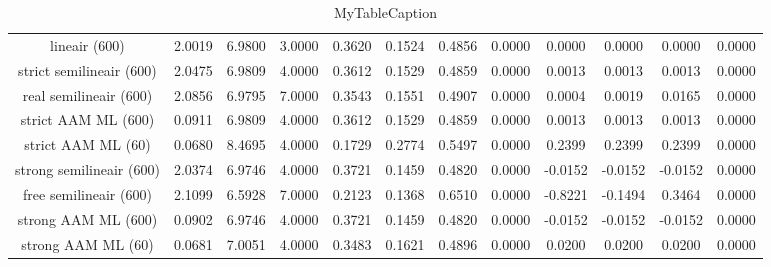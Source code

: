 \begin{table}
\centering
\begin{tabular}{|c|c|c|c|c|c|c|c|c|c|c|c|}
\hline
 &  &  &  &  &  &  &  &  &  &  &  \\
\hline
lineair (600) & 2.0019 & 6.9800 & 3.0000 & 0.3620 & 0.1524 & 0.4856 & 0.0000 & 0.0000 & 0.0000 & 0.0000 & 0.0000 \\
\hline
strict semilineair (600) & 2.0475 & 6.9809 & 4.0000 & 0.3612 & 0.1529 & 0.4859 & 0.0000 & 0.0013 & 0.0013 & 0.0013 & 0.0000 \\
\hline
real semilineair (600) & 2.0856 & 6.9795 & 7.0000 & 0.3543 & 0.1551 & 0.4907 & 0.0000 & 0.0004 & 0.0019 & 0.0165 & 0.0000 \\
\hline
strict AAM ML (600) & 0.0911 & 6.9809 & 4.0000 & 0.3612 & 0.1529 & 0.4859 & 0.0000 & 0.0013 & 0.0013 & 0.0013 & 0.0000 \\
\hline
strict AAM ML (60) & 0.0680 & 8.4695 & 4.0000 & 0.1729 & 0.2774 & 0.5497 & 0.0000 & 0.2399 & 0.2399 & 0.2399 & 0.0000 \\
\hline
strong semilineair (600) & 2.0374 & 6.9746 & 4.0000 & 0.3721 & 0.1459 & 0.4820 & 0.0000 & -0.0152 & -0.0152 & -0.0152 & 0.0000 \\
\hline
free semilineair (600) & 2.1099 & 6.5928 & 7.0000 & 0.2123 & 0.1368 & 0.6510 & 0.0000 & -0.8221 & -0.1494 & 0.3464 & 0.0000 \\
\hline
strong AAM ML (600) & 0.0902 & 6.9746 & 4.0000 & 0.3721 & 0.1459 & 0.4820 & 0.0000 & -0.0152 & -0.0152 & -0.0152 & 0.0000 \\
\hline
strong AAM ML (60) & 0.0681 & 7.0051 & 4.0000 & 0.3483 & 0.1621 & 0.4896 & 0.0000 & 0.0200 & 0.0200 & 0.0200 & 0.0000 \\
\hline
\end{tabular}
\caption{MyTableCaption}
\label{table:MyTableLabel}
\end{table}
